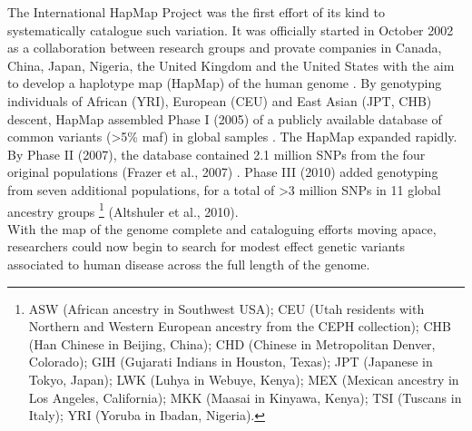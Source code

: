 The International HapMap Project was the first effort of its kind to systematically catalogue such variation. 
It was officially started in October 2002 as a collaboration between research groups and provate companies in Canada, China, Japan, Nigeria, the United Kingdom and the United States with the aim to develop a haplotype map (HapMap) of the human genome \cite{international2003international}.
By genotyping individuals of African (YRI), European (CEU) and East Asian (JPT, CHB) descent, HapMap assembled Phase I (2005) of a publicly available database of common variants (>5\% \gls{maf}) in global samples \cite{international2005haplotype}. 
The HapMap expanded rapidly. 
By Phase II (2007), the database contained 2.1 million SNPs from the four original populations (Frazer et al., 2007) \cite{international2007second}.
Phase III (2010) added genotyping from seven additional populations, for a total of >3 million SNPs in 11 global ancestry groups \footnote{ASW (African ancestry in Southwest USA); CEU (Utah residents with Northern and Western European ancestry from the CEPH collection); CHB (Han Chinese in Beijing, China); CHD (Chinese in Metropolitan Denver, Colorado); GIH (Gujarati Indians in Houston, Texas); JPT (Japanese in Tokyo, Japan); LWK (Luhya in Webuye, Kenya); MEX (Mexican ancestry in Los Angeles, California); MKK (Maasai in Kinyawa, Kenya); TSI (Tuscans in Italy); YRI (Yoruba in Ibadan, Nigeria).} (Altshuler et al., 2010).\\ 
With the map of the genome complete and cataloguing efforts moving apace, researchers could now begin to search for modest effect genetic variants associated to human disease across the full length of the genome.





